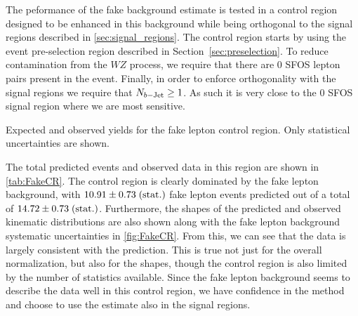 



The peformance of the fake background estimate is tested in a control region
designed to be enhanced in this background while being orthogonal to the signal regions
described in \sec\ref{sec:signal_regions}.
The control region starts by using the event pre-selection region described 
in Section~\ref{sec:preselection}. To reduce contamination 
from the $WZ$ process, we require that there are 0 SFOS 
lepton pairs present in the event.
Finally, in order to enforce 
orthogonality with the signal regions
we require that $N_{b-\textrm{Jet}} \geq 1$. 
As such it is very close to the 0 SFOS signal region where we are most sensitive.

\begin{table}[ht!]
\centering

\caption{Expected and observed yields for the fake lepton control region. Only statistical
uncertainties are shown.}
\label{tab:FakeCR}
\end{table}




The total predicted events and observed data in this region are shown in \tab\ref{tab:FakeCR}.
The control region is clearly dominated by the fake lepton background, with $10.91 \pm 0.73\mbox{$\;$(stat.)}$ 
fake lepton events predicted out of a total of $14.72 \pm 0.73\mbox{$\;$(stat.)}$. Furthermore, the shapes
of the predicted and observed kinematic distributions are also shown along with the
fake lepton background systematic uncertainties in \fig\ref{fig:FakeCR}.  From this, 
we can see that the data is largely consistent with the prediction. This is true not just
for the overall normalization, but also for the shapes, though the control region is also 
limited by the number of statistics available. Since the fake lepton background
seems to describe the data well in this control region, we have confidence in the method
and choose to use the estimate also in the signal regions. 



